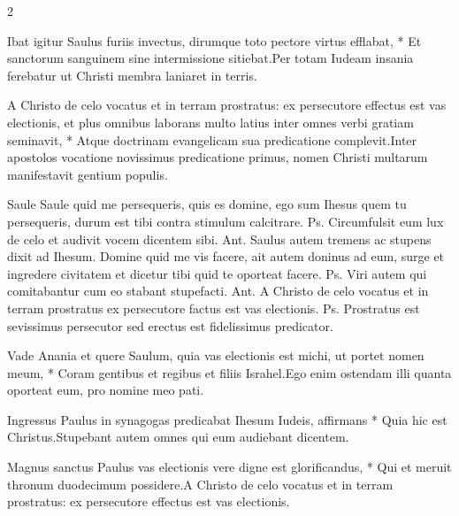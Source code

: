 \begin{multicols*}{2}
\begin{responsory}
{Ibat igitur Saulus furiis invectus, dirumque toto pectore virtus efflabat, * Et sanctorum sanguinem sine intermissione sitiebat.}{Per totam Iudeam insania ferebatur ut Christi membra laniaret in terris.}%
\end{responsory}%
\begin{responsory-doxology}[a-christo-de]
{A Christo de celo vocatus et in terram prostratus: ex persecutore effectus est vas electionis, et plus omnibus laborans multo latius inter omnes verbi gratiam seminavit, * Atque doctrinam evangelicam sua predicatione complevit.}{Inter apostolos vocatione novissimus predicatione primus, nomen Christi multarum manifestavit gentium populis.}
\end{responsory-doxology}%
 Saule Saule quid me persequeris, quis es domine, ego sum Ihesus quem tu persequeris, durum est tibi contra stimulum calcitrare. {\color{Red} Ps.}  \V Circumfulsit eum lux de celo et audivit vocem dicentem sibi. {\color{Red} Ant.} Saulus autem tremens ac stupens dixit ad Ihesum. Domine quid me vis facere, ait autem doninus ad eum, surge et ingredere civitatem et dicetur tibi quid te oporteat facere. {\color{Red} Ps.}  \V Viri autem qui comitabantur cum eo stabant stupefacti. {\color{Red} Ant.} A Christo de celo vocatus et in terram prostratus ex persecutore factus est vas electionis. {\color{Red} Ps.}  \V Prostratus est sevissimus persecutor sed erectus est fidelissimus predicator.
\begin{responsory}
{Vade Anania et quere Saulum, quia vas electionis est michi, ut portet nomen meum, * Coram gentibus et regibus et filiis Israhel.}{Ego enim ostendam illi quanta oporteat eum, pro nomine meo pati.}
\end{responsory}%
\begin{responsory}
{Ingressus Paulus in synagogas predicabat Ihesum Iudeis, affirmans * Quia hic est Christus.}{Stupebant autem omnes qui eum audiebant dicentem.}
\end{responsory}%
\begin{responsory-doxology}
{Magnus sanctus Paulus vas electionis vere digne est glorificandus, * Qui et meruit thronum duodecimum possidere.}{A Christo de celo vocatus et in terram prostratus: ex persecutore effectus est vas electionis.}
\end{responsory-doxology}%

\end{multicols*}
